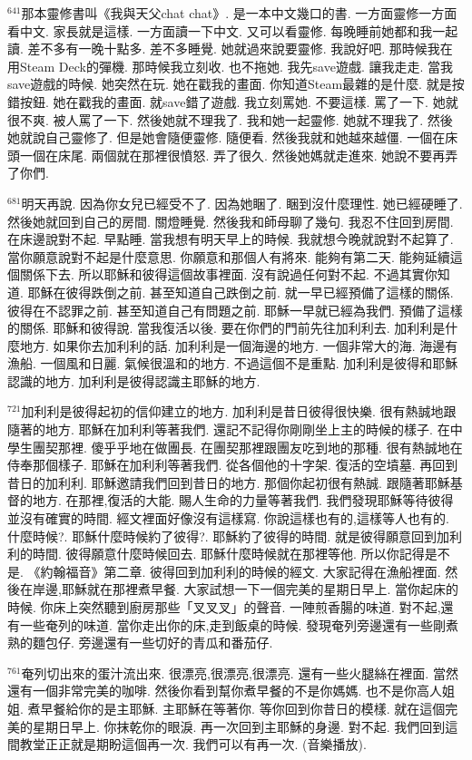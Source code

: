\documentclass{book}
\begin{document}
$^{641}$那本靈修書叫《我與天父chat chat》.
是一本中文幾口的書.
一方面靈修一方面看中文.
家長就是這樣.
一方面讀一下中文.
又可以看靈修.
每晚睡前她都和我一起讀.
差不多有一晚十點多.
差不多睡覺.
她就過來說要靈修.
我說好吧.
那時候我在用Steam Deck的彈機.
那時候我立刻收.
也不拖她.
我先save遊戲.
讓我走走.
當我save遊戲的時候.
她突然在玩.
她在戳我的畫面.
你知道Steam最雜的是什麼.
就是按錯按鈕.
她在戳我的畫面.
就save錯了遊戲.
我立刻罵她.
不要這樣.
罵了一下.
她就很不爽.
被人罵了一下.
然後她就不理我了.
我和她一起靈修.
她就不理我了.
然後她就說自己靈修了.
但是她會隨便靈修.
隨便看.
然後我就和她越來越僵.
一個在床頭一個在床尾.
兩個就在那裡很憤怒.
弄了很久.
然後她媽就走進來.
她說不要再弄了你們.

$^{681}$明天再說.
因為你女兒已經受不了.
因為她睏了.
睏到沒什麼理性.
她已經硬睡了.
然後她就回到自己的房間.
關燈睡覺.
然後我和師母聊了幾句.
我忍不住回到房間.
在床邊說對不起.
早點睡.
當我想有明天早上的時候.
我就想今晚就說對不起算了.
當你願意說對不起是什麼意思.
你願意和那個人有將來.
能夠有第二天.
能夠延續這個關係下去.
所以耶穌和彼得這個故事裡面.
沒有說過任何對不起.
不過其實你知道.
耶穌在彼得跌倒之前.
甚至知道自己跌倒之前.
就一早已經預備了這樣的關係.
彼得在不認罪之前.
甚至知道自己有問題之前.
耶穌一早就已經為我們.
預備了這樣的關係.
耶穌和彼得說.
當我復活以後.
要在你們的門前先往加利利去.
加利利是什麼地方.
如果你去加利利的話.
加利利是一個海邊的地方.
一個非常大的海.
海邊有漁船.
一個風和日麗.
氣候很溫和的地方.
不過這個不是重點.
加利利是彼得和耶穌認識的地方.
加利利是彼得認識主耶穌的地方.

$^{721}$加利利是彼得起初的信仰建立的地方.
加利利是昔日彼得很快樂.
很有熱誠地跟隨著的地方.
耶穌在加利利等著我們.
還記不記得你剛剛坐上主的時候的樣子.
在中學生團契那裡.
傻乎乎地在做團長.
在團契那裡跟團友吃到地的那種.
很有熱誠地在侍奉那個樣子.
耶穌在加利利等著我們.
從各個他的十字架.
復活的空墳墓.
再回到昔日的加利利.
耶穌邀請我們回到昔日的地方.
那個你起初很有熱誠.
跟隨著耶穌基督的地方.
在那裡,復活的大能.
賜人生命的力量等著我們.
我們發現耶穌等待彼得並沒有確實的時間.
經文裡面好像沒有這樣寫.
你說這樣也有的,這樣等人也有的.
什麼時候?.
耶穌什麼時候約了彼得?.
耶穌約了彼得的時間.
就是彼得願意回到加利利的時間.
彼得願意什麼時候回去.
耶穌什麼時候就在那裡等他.
所以你記得是不是.
《約翰福音》第二章.
彼得回到加利利的時候的經文.
大家記得在漁船裡面.
然後在岸邊,耶穌就在那裡煮早餐.
大家試想一下一個完美的星期日早上.
當你起床的時候.
你床上突然聽到廚房那些「叉叉叉」的聲音.
一陣煎香腸的味道.
對不起,還有一些奄列的味道.
當你走出你的床,走到飯桌的時候.
發現奄列旁邊還有一些剛煮熟的麵包仔.
旁邊還有一些切好的青瓜和番茄仔.

$^{761}$奄列切出來的蛋汁流出來.
很漂亮,很漂亮,很漂亮.
還有一些火腿絲在裡面.
當然還有一個非常完美的咖啡.
然後你看到幫你煮早餐的不是你媽媽.
也不是你高人姐姐.
煮早餐給你的是主耶穌.
主耶穌在等著你.
等你回到你昔日的模樣.
就在這個完美的星期日早上.
你抹乾你的眼淚.
再一次回到主耶穌的身邊.
對不起.
我們回到這間教堂正正就是期盼這個再一次.
我們可以有再一次.
(音樂播放).
\newpage
\end{document}
